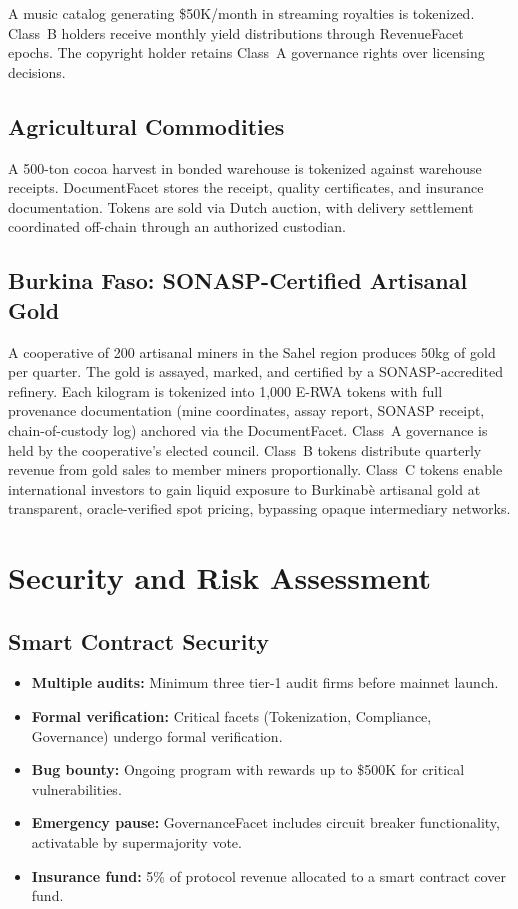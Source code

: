 \documentclass[11pt,a4paper]{article}
\begin{document}
A music catalog generating \$50K/month in streaming royalties is tokenized. Class~B holders receive monthly yield distributions through RevenueFacet epochs. The copyright holder retains Class~A governance rights over licensing decisions.

\subsection{Agricultural Commodities}

A 500-ton cocoa harvest in bonded warehouse is tokenized against warehouse receipts. DocumentFacet stores the receipt, quality certificates, and insurance documentation. Tokens are sold via Dutch auction, with delivery settlement coordinated off-chain through an authorized custodian.

\subsection{Burkina Faso: SONASP-Certified Artisanal Gold}

A cooperative of 200 artisanal miners in the Sahel region produces 50kg of gold per quarter. The gold is assayed, marked, and certified by a SONASP-accredited refinery. Each kilogram is tokenized into 1,000 E-RWA tokens with full provenance documentation (mine coordinates, assay report, SONASP receipt, chain-of-custody log) anchored via the DocumentFacet. Class~A governance is held by the cooperative's elected council. Class~B tokens distribute quarterly revenue from gold sales to member miners proportionally. Class~C tokens enable international investors to gain liquid exposure to Burkinab\`e artisanal gold at transparent, oracle-verified spot pricing, bypassing opaque intermediary networks.

\section{Security and Risk Assessment}
\label{sec:security}

\subsection{Smart Contract Security}

\begin{itemize}[nosep]
    \item \textbf{Multiple audits:} Minimum three tier-1 audit firms before mainnet launch.
    \item \textbf{Formal verification:} Critical facets (Tokenization, Compliance, Governance) undergo formal verification.
    \item \textbf{Bug bounty:} Ongoing program with rewards up to \$500K for critical vulnerabilities.
    \item \textbf{Emergency pause:} GovernanceFacet includes circuit breaker functionality, activatable by supermajority vote.
    \item \textbf{Insurance fund:} 5\% of protocol revenue allocated to a smart contract cover fund.
\end{itemize}
\end{document}
